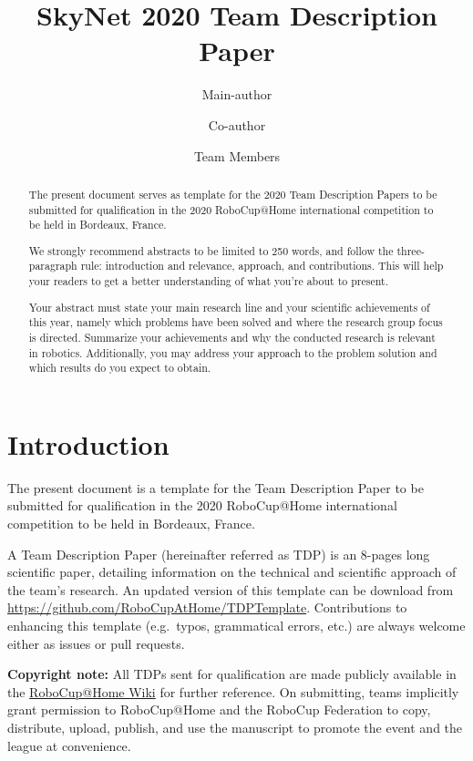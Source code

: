 \documentclass[runningheads,a4paper]{llncs}
\title{SkyNet 2020 Team Description Paper}
\author{Main-author \and Co-author \and Team Members}
\institute{Affiliation name and address, \\
\texttt{http://devoted-web-site.url}}
\begin{document}
\maketitle

%
%

\begin{abstract}
The present document serves as template for the 2020 Team Description Papers to be submitted for qualification in the 2020 RoboCup@Home international competition to be held in Bordeaux, France.

We strongly recommend abstracts to be limited to 250 words, and follow the three-paragraph rule: introduction and relevance, approach, and contributions. This will help your readers to get a better understanding of what you're about to present.

Your abstract must state your main research line and your scientific achievements of this year, namely which problems have been solved and where the research group focus is directed.
Summarize your achievements and why the conducted research is relevant in robotics.
Additionally, you may address your approach to the problem solution and which results do you expect to obtain.
\end{abstract}



\section{Introduction}
The present document is a template for the Team Description Paper to be submitted for qualification in the 2020 RoboCup@Home international competition to be held in Bordeaux, France.

A Team Description Paper (hereinafter referred as TDP) is an 8-pages long scientific paper, detailing information on the technical and scientific approach of the team's research.
An updated version of this template can be download from {\small\url{https://github.com/RoboCupAtHome/TDPTemplate}}.
Contributions to enhancing this template (e.g.~typos, grammatical errors, etc.) are always welcome either as issues or pull requests.

\textbf{Copyright note:} All TDPs sent for qualification are made publicly available in the \href{https://github.com/RoboCupAtHome/AtHomeCommunityWiki/wiki}{RoboCup@Home Wiki} for further reference.
On submitting, teams implicitly grant permission to RoboCup@Home and the RoboCup Federation to copy, distribute, upload, publish, and use the manuscript to promote the event and the league at convenience.
\end{document}
